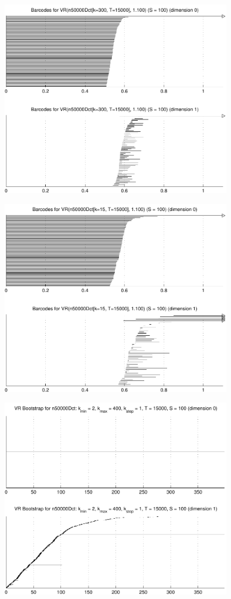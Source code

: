 \documentclass[10pt]{amsart}
\begin{document}
\vspace{0.5cm}
\hspace{3cm}\includegraphics[width=10cm]{n50000Dct-300-15000-1100.pdf}
\vspace{0.5cm}

\vspace{0.5cm}
\hspace{3cm}\includegraphics[width=10cm]{n50000Dct-15-15000-1100.pdf}
\vspace{0.5cm}

\vspace{0.5cm}
\hspace{3cm}\includegraphics[width=10cm]{n50000Dct-samples-2-400-1-15000-1100.pdf}
\vspace{0.5cm}
\end{document}
